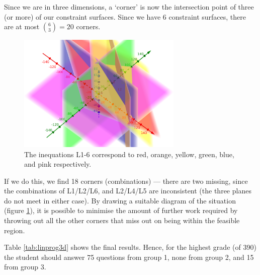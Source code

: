 \documentclass[a4paper,leqno]{article}
\numberwithin{equation}{section}
\theoremstyle{definition}
\theoremstyle{remark}
\begin{document}
Since we are in three dimensions, a `corner' is now the intersection point of three (or more) of our constraint
surfaces. Since we have 6 constraint surfaces, there are at most $ \binom{6}{3} = 20 $ corners.

\begin{figure}
  \centering
  \includegraphics[width=0.7\textwidth]{linprog3d}
  \caption{The inequations L1-6 correspond to red, orange, yellow, green, blue, and pink respectively.\label{fig:linprog3d}}
\end{figure}

If we do this, we find 18 corners (combinations) --- there are two missing, since the combinations of L1/L2/L6, and L2/L4/L5 are
inconsistent (the three planes do not meet in either case). By drawing a suitable diagram of the situation (figure \ref{fig:linprog3d}),
it is possible to minimise the amount of further work required by throwing out all the other corners that miss out on being within
the feasible region.

Table \ref{tab:linprog3d} shows the final results. Hence, for the highest grade (of 390) the student should answer 75 questions from
group 1, none from group 2, and 15 from group 3.
\end{document}
